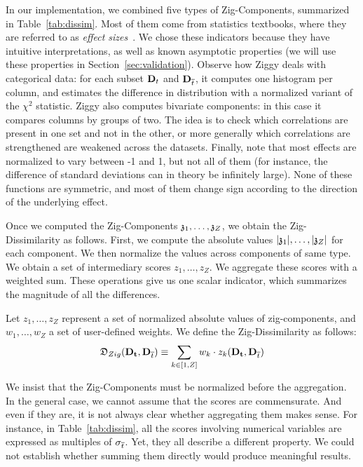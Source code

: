 In our implementation, we combined five types of Zig-Com\-po\-nents, summarized
in Table~\ref{tab:dissim}.  Most of them come from statistics textbooks, where
they are referred to as \emph{effect sizes}~\cite{cohen1977statistical}. We
chose these indicators because they have intuitive interpretations, as well as
known asymptotic properties (we will use these properties in
Section~\ref{sec:validation}). Observe how Ziggy deals with categorical data:
for each subset $\mathbf{D}_t$ and $\mathbf{D}_{\overline{t}}$, it computes one histogram per
column, and estimates the difference in distribution with a normalized variant
of the $\chi^2$ statistic. Ziggy also computes bivariate components: in this
case it compares columns by groups of two. The idea is to check which
correlations are present in one set and not in the other, or more generally
which correlations are strengthened are weakened across the datasets. Finally, note that
most effects are normalized to vary between -1 and 1, but not all of them (for
instance, the difference of standard deviations can in theory be infinitely
large). None of these functions are symmetric, and most of them change sign
according to the direction of the underlying effect.

Once we computed the Zig-Components $\mathfrak{z}_1, \ldots, \mathfrak{z}_Z$, we obtain the
Zig-Dissimilarity as follows. First, we compute the absolute values
$|\mathfrak{z}_1|, \ldots, |\mathfrak{z}_Z|$ for each component. We then normalize the
values across components of same type. We obtain a set of intermediary scores
$z_1, \ldots, z_Z$. We aggregate these scores with a weighted sum.
These operations give us one scalar indicator, which summarizes the magnitude
of all the differences.

\begin{definition}
    Let $z_1, \ldots, z_Z$ represent a set of normalized absolute values of
    zig-components, and $w_1, \ldots, w_Z$ a set of user-defined weights.  We
    define the Zig-Dissimilarity as follows: 
    \begin{equation}
        \mathfrak{D}_{Zig}(\mathbf{D_t}, \mathbf{D}_{\overline{t}}) 
        \equiv \sum_{k \in [1, Z]} w_k \cdot z_k(\mathbf{D_t}, \mathbf{D}_{\overline{t}})
    \end{equation}
\end{definition}
We insist that the Zig-Components must be normalized before the aggregation.
In the general case, we cannot assume that the scores are commensurate. And
even if they are, it is not always clear whether aggregating them makes sense.
For instance, in Table~\ref{tab:dissim}, all the scores involving numerical
variables are expressed as multiples of $\sigma_{\overline{t}}$. Yet, they all
describe a different property. We could not establish whether summing
them directly would produce meaningful results.

